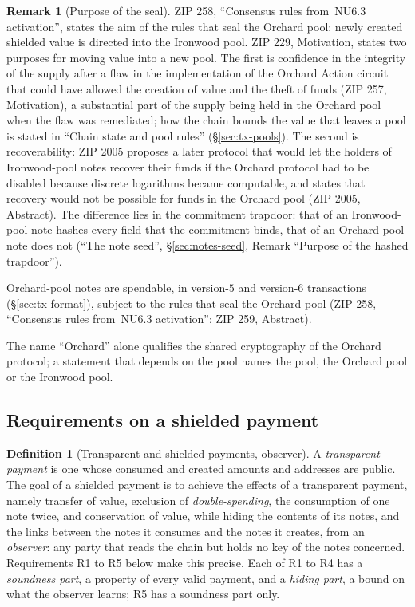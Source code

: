 \documentclass[11pt,a4paper]{article}
\theoremstyle{definition}
\newtheorem{definition}[theorem]{Definition}
\newtheorem{remark}[theorem]{Remark}
\begin{document}
\begin{remark}[Purpose of the seal]
ZIP 258, ``Consensus rules from~NU6.3 activation'', states the aim of the
rules that seal the Orchard pool: newly created shielded value is directed
into the Ironwood pool. ZIP 229, Motivation, states two purposes for moving
value into a new pool. The first is confidence in the integrity of the
supply after a flaw in the implementation of the Orchard Action circuit that
could have allowed the creation of value and the theft of funds (ZIP 257,
Motivation), a substantial part of the supply being held in the Orchard pool
when the flaw was remediated; how the chain bounds the value that leaves a
pool is stated in ``Chain state and pool rules'' (\S\ref{sec:tx-pools}). The
second is recoverability: ZIP 2005 proposes a later protocol that would let
the holders of Ironwood-pool notes recover their funds if the Orchard
protocol had to be disabled because discrete logarithms became computable,
and states that recovery would not be possible for funds in the Orchard pool
(ZIP 2005, Abstract). The difference lies in the commitment trapdoor: that
of an Ironwood-pool note hashes every field that the commitment binds, that
of an Orchard-pool note does not (``The note seed'',
\S\ref{sec:notes-seed}, Remark ``Purpose of the hashed trapdoor'').
\end{remark}

Orchard-pool notes are spendable, in version-$5$ and version-$6$
transactions (\S\ref{sec:tx-format}), subject to the rules that seal the
Orchard pool (ZIP 258, ``Consensus rules from~NU6.3 activation''; ZIP 259,
Abstract).

The name ``Orchard'' alone qualifies the shared cryptography of the Orchard
protocol; a statement that depends on the pool names the pool, the Orchard
pool or the Ironwood pool.

\subsection{Requirements on a shielded payment}\label{sec:intro-req}

\begin{definition}[Transparent and shielded payments, observer]
A \emph{transparent payment} is one whose consumed and created amounts and
addresses are public. The goal of a shielded payment is to achieve the
effects of a transparent payment, namely transfer of value, exclusion of
\emph{double-spending}, the consumption of one note twice, and conservation
of value, while hiding the contents of its notes, and the links between the
notes it consumes and the notes it creates, from an \emph{observer}: any
party that reads the chain but holds no key of the notes concerned.
Requirements R1 to R5 below make this precise. Each of R1 to R4 has a
\emph{soundness part}, a property of every valid payment, and a
\emph{hiding part}, a bound on what the observer learns; R5 has a soundness
part only.
\end{definition}
\end{document}
